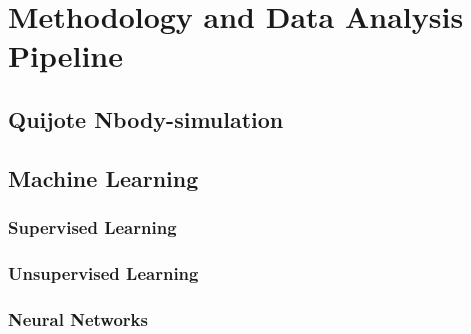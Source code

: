 \chapter{Methodology and Data Analysis Pipeline}
\section{Quijote Nbody-simulation}
\section{Machine Learning}
\subsection{Supervised Learning}
\subsection{Unsupervised Learning}
\subsection{Neural Networks}

